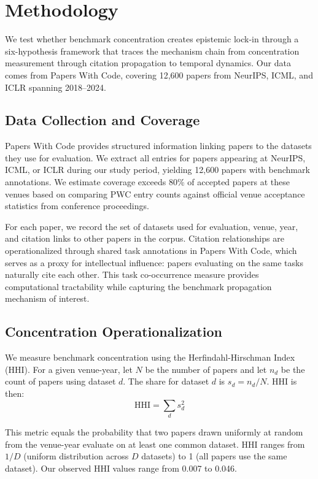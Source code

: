 \section{Methodology}

We test whether benchmark concentration creates epistemic lock-in through a six-hypothesis framework that traces the mechanism chain from concentration measurement through citation propagation to temporal dynamics. Our data comes from Papers With Code, covering 12,600 papers from NeurIPS, ICML, and ICLR spanning 2018--2024.

\subsection{Data Collection and Coverage}

Papers With Code provides structured information linking papers to the datasets they use for evaluation. We extract all entries for papers appearing at NeurIPS, ICML, or ICLR during our study period, yielding 12,600 papers with benchmark annotations. We estimate coverage exceeds 80\% of accepted papers at these venues based on comparing PWC entry counts against official venue acceptance statistics from conference proceedings.

For each paper, we record the set of datasets used for evaluation, venue, year, and citation links to other papers in the corpus. Citation relationships are operationalized through shared task annotations in Papers With Code, which serves as a proxy for intellectual influence: papers evaluating on the same tasks naturally cite each other. This task co-occurrence measure provides computational tractability while capturing the benchmark propagation mechanism of interest.

\subsection{Concentration Operationalization}

We measure benchmark concentration using the Herfindahl-Hirschman Index (HHI). For a given venue-year, let $N$ be the number of papers and let $n_d$ be the count of papers using dataset $d$. The share for dataset $d$ is $s_d = n_d / N$. HHI is then:
\begin{equation}
\text{HHI} = \sum_d s_d^2
\end{equation}

This metric equals the probability that two papers drawn uniformly at random from the venue-year evaluate on at least one common dataset. HHI ranges from $1/D$ (uniform distribution across $D$ datasets) to 1 (all papers use the same dataset). Our observed HHI values range from 0.007 to 0.046.


